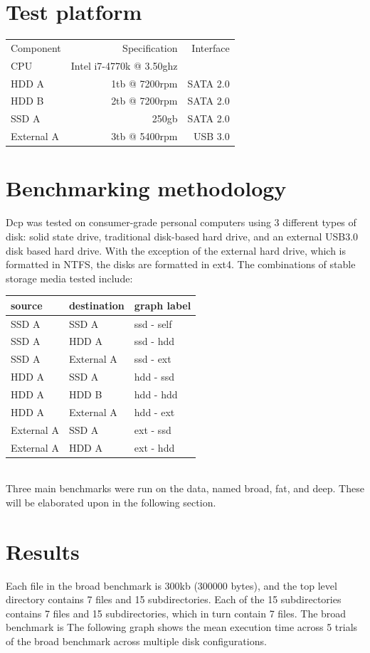 \documentclass[12pt]{article}
\begin{document}
\section {Test platform}
\begin{tabular}{l|r r}
  Component & Specification                   & Interface \\
  CPU       & Intel i7-4770k @ 3.50ghz                    \\
  HDD A     &         1tb @ 7200rpm           & SATA 2.0  \\
  HDD B     &                 2tb @ 7200rpm   & SATA 2.0  \\
  SSD A     &         250gb                   & SATA 2.0  \\
  External A& 3tb @ 5400rpm                   & USB 3.0   \\
\end{tabular}
\section{Benchmarking methodology}
Dcp was tested on consumer-grade personal computers using 3 different types
of disk: solid state drive, traditional disk-based hard drive, and
an external USB3.0 disk based hard drive. With the exception of the external
hard drive, which is formatted in NTFS, the disks are formatted in ext4.
The combinations of stable storage media tested include:\\
\begin{tabular}{|l|l|l|}
  \hline
  source  & destination & graph label \\
  \hline
  SSD A   & SSD A       & ssd - self  \\
  SSD A   & HDD A       & ssd - hdd   \\
  SSD A   & External A  & ssd - ext   \\
  HDD A   & SSD A       & hdd - ssd   \\
  HDD A   & HDD B       & hdd - hdd   \\
  HDD A   & External A  & hdd - ext   \\
  External A & SSD A    & ext - ssd   \\
  External A & HDD A    & ext - hdd   \\
  \hline
\end{tabular} \\
Three main benchmarks were run on the data, named broad, fat, and deep.
These will be elaborated upon in the following section.

\section{Results}
Each file in the broad benchmark is 300kb (300000 bytes), and
the top level directory contains 7 files and 15 subdirectories. Each of the 15 subdirectories
contains 7 files and 15 subdirectories, which in turn contain 7 files.
The broad benchmark is %
The following graph shows the mean execution time across 5 trials of the broad benchmark across multiple disk configurations.
\vspace{5mm}
\end{document}
